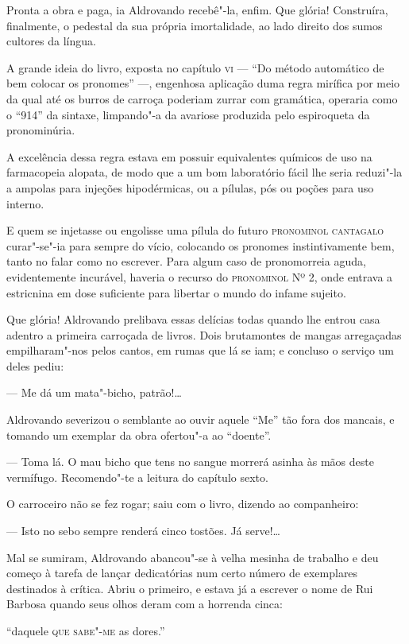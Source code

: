 Pronta a obra e paga, ia Aldrovando recebê"-la, enfim. Que glória!
Construíra, finalmente, o pedestal da sua própria imortalidade, ao lado
direito dos sumos cultores da língua.

A grande ideia do livro, exposta no capítulo \textsc{vi} --- ``Do método
automático de bem colocar os pronomes'' ---, engenhosa aplicação duma
regra mirífica por meio da qual até os burros de carroça poderiam zurrar
com gramática, operaria como o ``914'' da sintaxe, limpando"-a da
avariose produzida pelo espiroqueta da pronominúria.

A excelência dessa regra estava em possuir equivalentes químicos de uso
na farmacopeia alopata, de modo que a um bom laboratório fácil lhe seria
reduzi"-la a ampolas para injeções hipodérmicas, ou a pílulas, pós ou
poções para uso interno.

E quem se injetasse ou engolisse uma pílula do futuro \textsc{pronominol
cantagalo} curar"-se"-ia para sempre do vício, colocando os pronomes
instintivamente bem, tanto no falar como no escrever. Para algum caso de
pronomorreia aguda, evidentemente incurável, haveria o recurso do
\textsc{pronominol} Nº 2, onde entrava a estricnina em dose suficiente para
libertar o mundo do infame sujeito.

Que glória! Aldrovando prelibava essas delícias todas quando lhe entrou
casa adentro a primeira carroçada de livros. Dois brutamontes de mangas
arregaçadas empilharam"-nos pelos cantos, em rumas que lá se iam; e
concluso o serviço um deles pediu:

--- Me dá um mata"-bicho, patrão!\ldots{}

Aldrovando severizou o semblante ao ouvir aquele ``Me'' tão fora dos
mancais, e tomando um exemplar da obra ofertou"-a ao ``doente''.

--- Toma lá. O mau bicho que tens no sangue morrerá asinha às mãos deste
vermífugo. Recomendo"-te a leitura do capítulo sexto.

O carroceiro não se fez rogar; saiu com o livro, dizendo ao companheiro:

--- Isto no sebo sempre renderá cinco tostões. Já serve!\ldots{}

Mal se sumiram, Aldrovando abancou"-se à velha mesinha de trabalho e deu
começo à tarefa de lançar dedicatórias num certo número de exemplares
destinados à crítica. Abriu o primeiro, e estava já a escrever o nome de
Rui Barbosa quando seus olhos deram com a horrenda cinca:

``daquele \textsc{que sabe"-me} as dores.''

